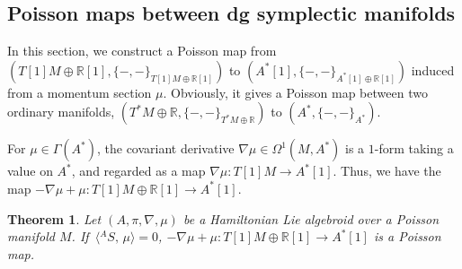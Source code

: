 \documentclass[pdftex]{sigma}
\numberwithin{equation}{section}
\newtheorem{Theorem}{Theorem}[section]
\def\bR{{\mathbb{R}}}
\newcommand{\bracket}[2]{\langle #1,\,#2\rangle}
\newcommand{\baS}{{{}^A S}}
\begin{document}
\subsection{Poisson maps between dg symplectic manifolds}\label{sec:Poissonmap}

In this section, we construct a Poisson map from
$(T[1]M \oplus \bR[1], \{-,-\}_{T[1]M \oplus \bR[1]})$
to $(A^*[1],\allowbreak \{-, -\}_{{A^*[1] \oplus \bR[1]}})$ induced from a momentum section $\mu$.
Obviously, it gives
a Poisson map between two ordinary manifolds, $(T^*M \oplus \bR, \{-,-\}_{T^*M \oplus \bR})$ to $(A^*, \{-, -\}_{A^*})$.


For $\mu \in \Gamma(A^*)$, the covariant derivative
$\nabla \mu \in \Omega^1(M, A^*)$
is a $1$-form taking a value on $A^*$, and
regarded as a map $\nabla \mu\colon T[1]M \rightarrow A^*[1]$.
Thus, we have the map $-\nabla \mu + \mu\colon T[1]M \oplus \bR[1]
\rightarrow A^*[1]$.





\begin{Theorem}\label{ThPoismap}
Let $(A, \pi, \nabla, \mu)$ be a Hamiltonian Lie algebroid over a Poisson manifold $M$.
If~${\bracket{\baS}{\mu} =0}$,
$-\nabla \mu + \mu\colon T[1]M \oplus \bR[1] \rightarrow A^*[1]$
is a Poisson map.
\end{Theorem}
\end{document}

